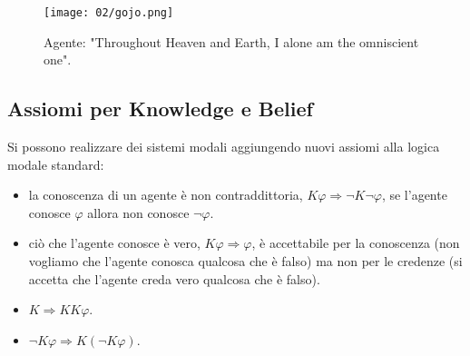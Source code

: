 \begin{figure}[!h]
    \centering
    \texttt{[image: 02/gojo.png]}
    \caption{Agente: "Throughout Heaven and Earth, I alone am the omniscient one".}
\end{figure}

\subsection{Assiomi per Knowledge e Belief}

Si possono realizzare dei sistemi modali aggiungendo nuovi assiomi alla logica modale standard: 

\begin{itemize}
  \item {} la conoscenza di un agente è non contraddittoria, $K\varphi \Rightarrow \neg K \neg\varphi$, se l'agente conosce $\varphi$ allora non conosce $\neg\varphi$. 
  \item {} ciò che l'agente conosce è vero, $K\varphi\Rightarrow\varphi$, è accettabile per la conoscenza (non vogliamo che l'agente conosca qualcosa che è falso) ma non per le credenze (si accetta che l'agente creda vero qualcosa che è falso). 
  \item {} $K\Rightarrow KK\varphi$.
  \item {} $\neg K\varphi \Rightarrow K(\neg K\varphi)$.
\end{itemize}


